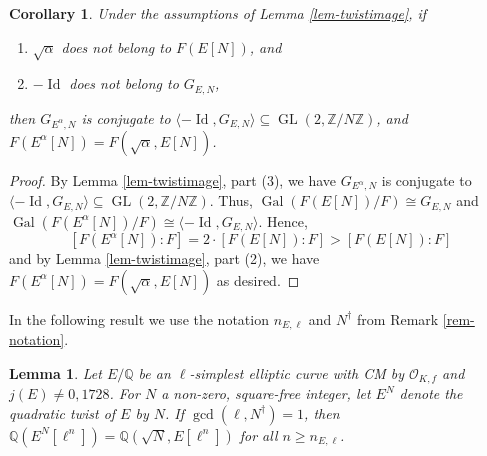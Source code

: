\documentclass[11pt]{amsart}
\newtheorem{lemma}[defn]{Lemma}
\newtheorem{cor}[defn]{Corollary}
\theoremstyle{definition}
\newcommand{\Q}{\mathbb{Q}}
\newcommand{\Z}{\mathbb{Z}}
\newcommand{\Of}{\mathcal{O}_{K,f}}
\newcommand{\Gal}{\operatorname{Gal}}
\newcommand{\GL}{\operatorname{GL}}
\begin{document}
\begin{cor}\label{cor-twistimage}
    Under the assumptions of Lemma \ref{lem-twistimage}, if
    \begin{enumerate}
        \item $\sqrt{\alpha}$ does not belong to $F(E[N])$, and
        \item $-\operatorname{Id}$ does not belong to $G_{E,N}$, 
    \end{enumerate}
    then $G_{E^\alpha,N}$  is conjugate to $\langle -\operatorname{Id},G_{E,N}\rangle \subseteq \GL(2,\Z/N\Z)$, and $F(E^\alpha[N])=F(\sqrt{\alpha},E[N])$.
\end{cor}
\begin{proof}
    By Lemma \ref{lem-twistimage}, part (3), we have $G_{E^\alpha,N}$ is conjugate to $\langle -\operatorname{Id},G_{E,N}\rangle \subseteq \GL(2,\Z/N\Z)$. Thus, $\Gal(F(E[N])/F)\cong G_{E,N}$ and $\Gal(F(E^\alpha[N])/F)\cong \langle -\operatorname{Id},G_{E,N}\rangle$. Hence, 
    $$[F(E^\alpha[N]):F]=2\cdot [F(E[N]):F] > [F(E[N]):F]$$
    and by Lemma \ref{lem-twistimage}, part (2), we have $F(E^\alpha[N])=F(\sqrt{\alpha},E[N])$ as desired.
\end{proof}

In the following result we use the notation $n_{E,\ell}$ and $N^\dagger$ from Remark \ref{rem-notation}.

\begin{lemma}
\label{lem-twistofsimplest}
    Let $E/\Q$ be an $\ell$-simplest elliptic curve with CM by $\Of$ and $j(E) \neq 0, 1728$. For $N$ a non-zero, square-free integer, let $E^N$ denote the quadratic twist of $E$ by $N$.    If $\gcd(\ell, N^{\dagger}) = 1$, then $\Q(E^N[\ell^n]) = \Q(\sqrt{N}, E[\ell^n])$ for all $n\geq n_{E,\ell}$.
\end{lemma}
\end{document}
